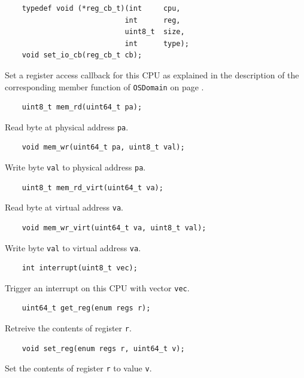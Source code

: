 \documentclass[letterpaper, 10pt]{book}
\begin{document}
\begin{verbatim}                                                               
    typedef void (*reg_cb_t)(int     cpu,
                            int      reg,
                            uint8_t  size,
                            int      type);
    void set_io_cb(reg_cb_t cb); 
\end{verbatim}
Set a register access callback for this CPU as explained in the description of
the corresponding member function of \texttt{OSDomain} on page
\pageref{func:set_reg_cb}.


\begin{verbatim}
    uint8_t mem_rd(uint64_t pa);
\end{verbatim}
Read byte at physical address \texttt{pa}.

\begin{verbatim}
    void mem_wr(uint64_t pa, uint8_t val);
\end{verbatim}
Write byte \texttt{val} to physical address \texttt{pa}.

\begin{verbatim}
    uint8_t mem_rd_virt(uint64_t va);
\end{verbatim}
Read byte at virtual address \texttt{va}.

\begin{verbatim}
    void mem_wr_virt(uint64_t va, uint8_t val);
\end{verbatim}
Write byte \texttt{val} to virtual address \texttt{va}.

\begin{verbatim}
    int interrupt(uint8_t vec);
\end{verbatim}
Trigger an interrupt on this CPU with vector \texttt{vec}.

\begin{verbatim}
    uint64_t get_reg(enum regs r);
\end{verbatim}
Retreive the contents of register \texttt{r}.

\begin{verbatim}
    void set_reg(enum regs r, uint64_t v);
\end{verbatim}
Set the contents of register \texttt{r} to value \texttt{v}.

\end{document}
